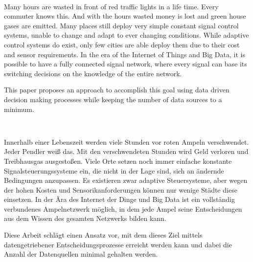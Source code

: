 \vspace{3cm}
\begingroup
{}\\
\endgroup
\vspace{1.5cm}

Many hours are wasted in front of red traffic lights in a life time. Every commuter knows this. And with the hours wasted money is lost and green house gases are emitted. Many places still deploy very simple constant signal control systems, unable to change and adapt to ever changing conditions. While adaptive control systems do exist, only few cities are able deploy them due to their cost and sensor requirements. In the era of the Internet of Things and Big Data, it is possible to have a fully connected signal network, where every signal can base its switching decisions on the knowledge of the entire network.

This paper proposes an approach to accomplish this goal using data driven decision making processes while keeping the number of data sources to a minimum.


\vspace{1.5cm}
\begingroup
{}\\
\endgroup
\vspace{1.5cm}

Innerhalb einer Lebenszeit werden viele Stunden vor roten Ampeln verschwendet. Jeder Pendler weiß das. Mit den verschwendeten Stunden wird Geld verloren und Treibhausgas ausgestoßen. Viele Orte setzen noch immer einfache konstante Signalsteuerungssysteme ein, die nicht in der Lage sind, sich an ändernde Bedingungen anzupassen. Es existieren zwar adaptive Steuersysteme, aber wegen der hohen Kosten und Sensorikanforderungen können nur wenige Städte diese einsetzen. In der Ära des Internet der Dinge und Big Data ist ein vollständig verbundenes Ampelnetzwerk möglich, in dem jede Ampel seine Entscheidungen aus dem Wissen des gesamten Netzwerks bilden kann.

Diese Arbeit schlägt einen Ansatz vor, mit dem dieses Ziel mittels datengetriebener Entscheidungsprozesse erreicht werden kann und dabei die Anzahl der Datenquellen minimal gehalten werden.
